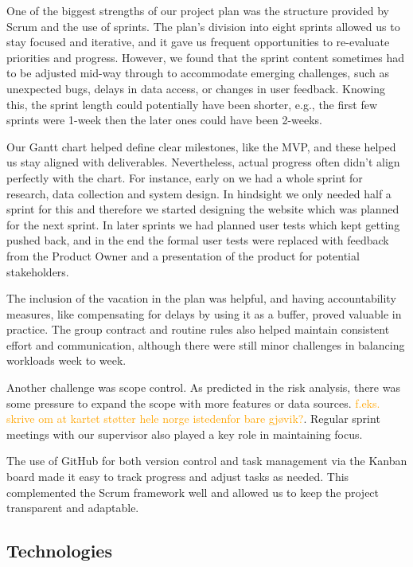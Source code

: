 One of the biggest strengths of our project plan was the structure provided by Scrum and the use of sprints. The plan’s division into eight sprints allowed us to stay focused and iterative, and it gave us frequent opportunities to re-evaluate priorities and progress. However, we found that the sprint content sometimes had to be adjusted mid-way through to accommodate emerging challenges, such as unexpected bugs, delays in data access, or changes in user feedback. Knowing this, the sprint length could potentially have been shorter, e.g., the first few sprints were 1-week then the later ones could have been 2-weeks. 

Our Gantt chart helped define clear milestones, like the MVP, and these helped us stay aligned with deliverables. Nevertheless, actual progress often didn’t align perfectly with the chart. For instance, early on we had a whole sprint for research, data collection and system design. In hindsight we only needed half a sprint for this and therefore we started designing the website which was planned for the next sprint. In later sprints we had planned user tests which kept getting pushed back, and in the end the formal user tests were replaced with feedback from the Product Owner and a presentation of the product for potential stakeholders.

The inclusion of the vacation in the plan was helpful, and having accountability measures, like compensating for delays by using it as a buffer, proved valuable in practice. The group contract and routine rules also helped maintain consistent effort and communication, although there were still minor challenges in balancing workloads week to week.

Another challenge was scope control. As predicted in the risk analysis, there was some pressure to expand the scope with more features or data sources. \textcolor{orange}{f.eks. skrive om at kartet støtter hele norge istedenfor bare gjøvik?}. Regular sprint meetings with our supervisor also played a key role in maintaining focus.

The use of GitHub for both version control and task management via the Kanban board made it easy to track progress and adjust tasks as needed. This complemented the Scrum framework well and allowed us to keep the project transparent and adaptable.

\subsection{Technologies}


